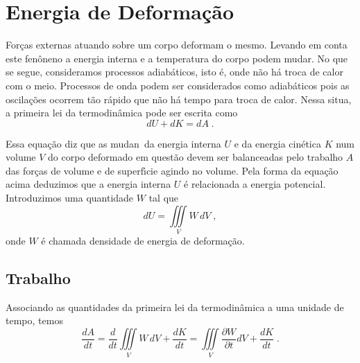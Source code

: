 \section{Energia de Deforma\c{c}\~ao}


For\c{c}as externas atuando sobre um corpo deformam o mesmo.
Levando em conta este fen\^oneno a energia interna
e a temperatura do corpo podem mudar. No que se segue,
consideramos processos adiab\'aticos, isto \'e, onde n\~ao h\'a troca
de calor com o meio. Processos de onda podem ser considerados
como adiab\'aticos pois as oscila\c{c}\~oes
ocorrem t\~ao r\'apido que n\~ao h\'a tempo para troca de calor.
Nessa situa\cao, a primeira lei da termodin\^amica pode ser escrita como
\begin{equation}
dU+dK=dA \;.
\end{equation}

Essa equa\c{c}\~ao diz que as mudan\cas\ da energia interna $U$ e da energia cin\'etica $K$ 
num volume $V$ do corpo deformado em quest\~ao
devem ser balanceadas pelo trabalho $A$ das for\c{c}as de volume e de superf\'\i cie
agindo no volume. Pela forma da equa\c{c}\~ao acima
deduzimos que a energia interna $U$ \'e
relacionada a energia potencial. Introduzimos uma quantidade $W$ tal que
\begin{equation}
dU=\iiint\limits_{V}W \,dV \;,
\end{equation}
onde $W$ \'e chamada densidade de energia de deforma\c{c}\~ao.


\subsection{Trabalho}

Associando as quantidades da primeira lei da termodin\^amica a uma unidade de tempo, temos
\begin{equation}
\frac{dA}{dt}=\frac{d}{dt}\iiint\limits_{V}W \,dV+\frac{dK}{dt}=
\iiint\limits_{V}\frac{\partial W}{\partial t} dV+\frac{dK}{dt} \;.
\end{equation}

